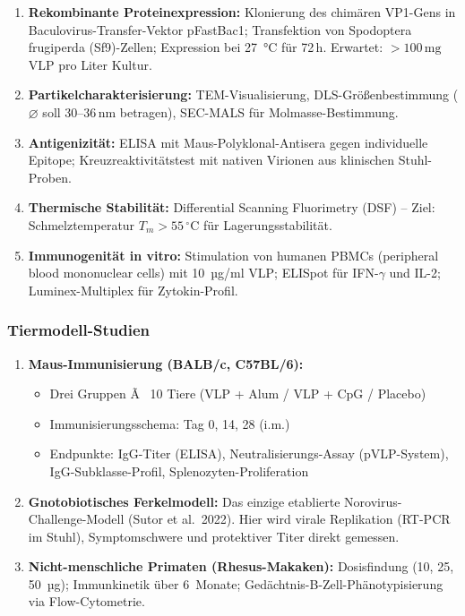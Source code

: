 ﻿\documentclass[a4paper,12pt]{article}
\theoremstyle{plain}
\theoremstyle{definition}
\theoremstyle{remark}
\begin{document}
\begin{enumerate}
  \item \textbf{Rekombinante Proteinexpression:} Klonierung des chimären VP1-Gens
        in Baculovirus-Transfer-Vektor pFastBac1; Transfektion von Spodoptera
        frugiperda (Sf9)-Zellen; Expression bei 27\, °C für 72\,h. Erwartet:
        $>100\,\text{mg}$ VLP pro Liter Kultur.
  \item \textbf{Partikelcharakterisierung:} TEM-Visualisierung, DLS-Größenbestimmung
        ($\varnothing$ soll 30--36\,nm betragen), SEC-MALS für Molmasse-Bestimmung.
  \item \textbf{Antigenizität:} ELISA mit Maus-Polyklonal-Antisera gegen individuelle
        Epitope; Kreuzreaktivitätstest mit nativen Virionen aus klinischen Stuhl-Proben.
  \item \textbf{Thermische Stabilität:} Differential Scanning Fluorimetry (DSF)
        -- Ziel: Schmelztemperatur $T_m > 55\,^\circ\text{C}$ für Lagerungsstabilität.
  \item \textbf{Immunogenität in vitro:} Stimulation von humanen PBMCs (peripheral
        blood mononuclear cells) mit 10\, µg/ml VLP; ELISpot für IFN-$\gamma$ und
        IL-2; Luminex-Multiplex für Zytokin-Profil.
\end{enumerate}

\subsubsection{Tiermodell-Studien}

\begin{enumerate}
  \item \textbf{Maus-Immunisierung (BALB/c, C57BL/6):}
        \begin{itemize}
          \item Drei Gruppen Ã  10 Tiere (VLP + Alum / VLP + CpG / Placebo)
          \item Immunisierungsschema: Tag 0, 14, 28 (i.m.)
          \item Endpunkte: IgG-Titer (ELISA), Neutralisierungs-Assay (pVLP-System),
                IgG-Subklasse-Profil, Splenozyten-Proliferation
        \end{itemize}
  \item \textbf{Gnotobiotisches Ferkelmodell:} Das einzige etablierte
        Norovirus-Challenge-Modell (Sutor et al.\ 2022). Hier wird virale Replikation
        (RT-PCR im Stuhl), Symptomschwere und protektiver Titer direkt gemessen.
  \item \textbf{Nicht-menschliche Primaten (Rhesus-Makaken):} Dosisfindung (10, 25,
        50\, µg); Immunkinetik über 6~Monate; Gedächtnis-B-Zell-Phänotypisierung
        via Flow-Cytometrie.
\end{enumerate}
\end{document}

